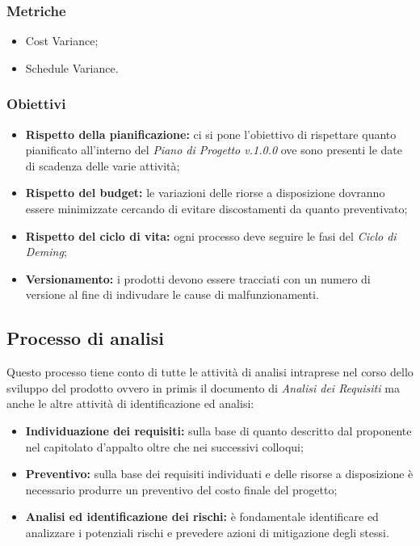 \subsubsection{Metriche}

\begin{itemize}
    \item Cost Variance;
    \item Schedule Variance.
\end{itemize}

\subsubsection{Obiettivi}
\begin{itemize}
    \item \textbf{Rispetto della pianificazione:} ci si pone l'obiettivo di rispettare quanto pianificato all'interno del \textit{Piano di Progetto v.1.0.0} 
    ove sono presenti le date di scadenza delle varie attività;
    \item \textbf{Rispetto del budget:} le variazioni delle riorse a disposizione dovranno essere minimizzate cercando di evitare discostamenti da quanto preventivato;
    \item \textbf{Rispetto del ciclo di vita:} ogni processo deve seguire le fasi del \textit{Ciclo di Deming};
    \item \textbf{Versionamento:} i prodotti devono essere tracciati con un numero di versione al fine di indivudare le cause di malfunzionamenti.
\end{itemize}


\subsection{Processo di analisi}
Questo processo tiene conto di tutte le attività di analisi intraprese nel corso dello sviluppo del prodotto ovvero in primis il documento di \textit{Analisi dei Requisiti}
ma anche le altre attività di identificazione ed analisi:

\begin{itemize}
    \item  \textbf{Individuazione dei requisiti:} sulla base di quanto descritto dal proponente nel capitolato d'appalto oltre che nei successivi colloqui;
    \item \textbf{Preventivo:} sulla base dei requisiti individuati e delle risorse a disposizione è necessario produrre un preventivo del costo finale del progetto;
    \item \textbf{Analisi ed identificazione dei rischi:} è fondamentale identificare ed analizzare i potenziali rischi e prevedere azioni di mitigazione degli stessi.
\end{itemize}

